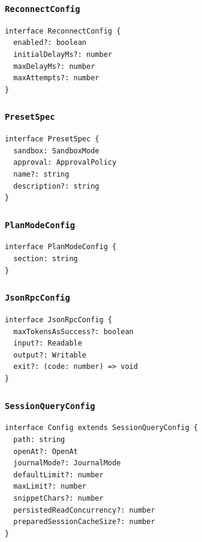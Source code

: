\documentclass[11pt,a4paper]{article}
\begin{document}
\subsubsection*{\texttt{ReconnectConfig}}


\begin{lstlisting}
interface ReconnectConfig {
  enabled?: boolean
  initialDelayMs?: number
  maxDelayMs?: number
  maxAttempts?: number
}
\end{lstlisting}


\subsubsection*{\texttt{PresetSpec}}


\begin{lstlisting}
interface PresetSpec {
  sandbox: SandboxMode
  approval: ApprovalPolicy
  name?: string
  description?: string
}
\end{lstlisting}


\subsubsection*{\texttt{PlanModeConfig}}


\begin{lstlisting}
interface PlanModeConfig {
  section: string
}
\end{lstlisting}


\subsubsection*{\texttt{JsonRpcConfig}}


\begin{lstlisting}
interface JsonRpcConfig {
  maxTokensAsSuccess?: boolean
  input?: Readable
  output?: Writable
  exit?: (code: number) => void
}
\end{lstlisting}


\subsubsection*{\texttt{SessionQueryConfig}}


\begin{lstlisting}
interface Config extends SessionQueryConfig {
  path: string
  openAt?: OpenAt
  journalMode?: JournalMode
  defaultLimit?: number
  maxLimit?: number
  snippetChars?: number
  persistedReadConcurrency?: number
  preparedSessionCacheSize?: number
}
\end{lstlisting}
\end{document}

